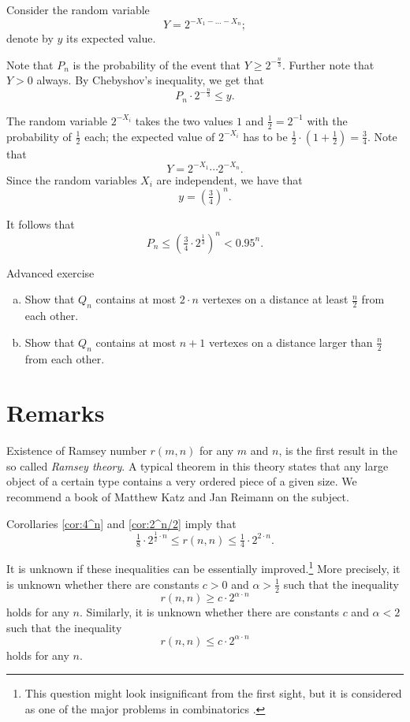 Consider the random variable 
\[Y=2^{-X_1-\dots-X_n};\]
denote by $y$ its expected value.

Note that $P_n$ is the probability of the event that $Y\ge 2^{-\frac n3}$.
Further note that $Y>0$ always. 
By Chebyshov's inequality, we get that
\[P_n\cdot 2^{-\frac n3}\le y.\]

The random variable $2^{-X_i}$ takes the two values $1$ and $\tfrac12=2^{-1}$ with the probability of $\tfrac12$ each;
the expected value of $2^{-X_i}$ has to be $\tfrac12\cdot (1+\tfrac12)=\tfrac 34$.
Note that 
\[Y=2^{-X_1}\cdots 2^{-X_n}.\]
Since the random variables $X_i$ are independent, we have that
\[y=\left(\tfrac34\right)^n.\]

It follows that 
\[P_n\le \left(\tfrac34\cdot 2^{\frac13}\right)^n< 0.95^n.\]
\qedsf

\pagebreak[1]
\begin{thm}{Advanced exercise}\label{ex:lin-Qn}
\begin{enumerate}[(a)]
\item Show that $Q_n$ contains at most $2\cdot n$ vertexes on a distance at least $\tfrac n2$ from each other. 
\item Show that $Q_n$ contains at most $n+1$ vertexes on a distance larger than $\tfrac n2$ from each other. 
\end{enumerate}
\end{thm}
 

\section*{Remarks}

Existence of Ramsey number $r(m,n)$ for any $m$ and $n$, is the first result in the so called \emph{Ramsey theory}. 
A typical theorem in this theory states that any large object of a certain type contains a very ordered piece of a given size.
We recommend a book of Matthew Katz and Jan Reimann \cite{katz-reimann} on the subject. 

Corollaries \ref{cor:4^n} and \ref{cor:2^n/2} imply that 
\[\tfrac18\cdot 2^{\frac12\cdot n}\le r(n,n)\le \tfrac14\cdot 2^{2\cdot n}.\]

It is unknown if these inequalities can be essentially improved.\footnote{This question might look insignificant from the first sight, but it is considered as one of the major problems in combinatorics \cite{gowers}.}
More precisely, it is unknown whether there are constants $c>0$ and $\alpha>\tfrac12$ such that the inequality
\[r(n,n)\ge c\cdot 2^{\alpha\cdot n}\]
holds for any $n$.
Similarly, it is unknown whether there are constants $c$ and $\alpha<2$ such that the inequality
\[r(n,n)\le c\cdot 2^{\alpha\cdot n}\]
holds for any $n$.


